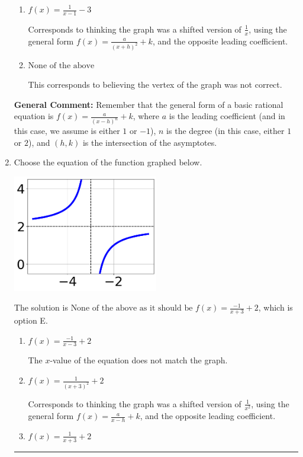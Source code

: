 \documentclass{extbook}[14pt]
\newcommand{\litem}[1]{\item #1

\rule{\textwidth}{0.4pt}}
\begin{document}
\begin{enumerate}
{\begin{enumerate}[label=\Alph*.]
Corresponds to thinking the graph was a shifted version of $\frac{1}{x}$.
\item \( f(x) = \frac{1}{x - 1} - 3 \)

Corresponds to thinking the graph was a shifted version of $\frac{1}{x}$, using the general form $f(x) = \frac{a}{(x+h)^2}+k$, and the opposite leading coefficient.
\item \( \text{None of the above} \)

This corresponds to believing the vertex of the graph was not correct.
\end{enumerate}

\textbf{General Comment:} Remember that the general form of a basic rational equation is $ f(x) = \frac{a}{(x-h)^n} + k$, where $a$ is the leading coefficient (and in this case, we assume is either $1$ or $-1$), $n$ is the degree (in this case, either $1$ or $2$), and $(h, k)$ is the intersection of the asymptotes.
}
\litem{
Choose the equation of the function graphed below.

\begin{center}
    \includegraphics[width=0.5\textwidth]{../Figures/rationalGraphToEquationC.png}
\end{center}


The solution is \( \text{None of the above as it should be } f(x) = \frac{-1}{x + 3} + 2 \), which is option E.\begin{enumerate}[label=\Alph*.]
\item \( f(x) = \frac{-1}{x - 3} + 2 \)

The $x$-value of the equation does not match the graph.
\item \( f(x) = \frac{1}{(x + 3)^2} + 2 \)

Corresponds to thinking the graph was a shifted version of $\frac{1}{x^2}$, using the general form $f(x) = \frac{a}{x-h}+k$, and the opposite leading coefficient.
\item \( f(x) = \frac{1}{x + 3} + 2 \)


\end{enumerate}}
\end{enumerate}
\end{document}
